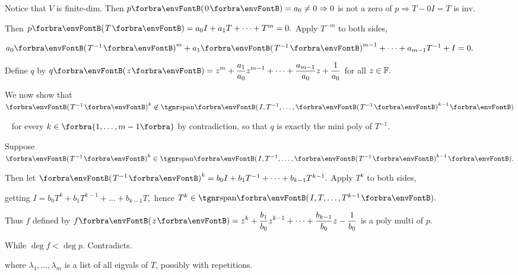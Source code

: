 \documentclass[a4paper, 11pt, UTF8]{article}
\begin{document}
\begin{large}
\par\quad
Notice that $V$ is finite-dim. Then $p\Par{0}=a_0\neq 0\Rightarrow 0$ is not a zero of $p\Rightarrow T-0I=T$ is inv.\par\quad
Then $p\Par{T}=a_0 I+a_1 T+\dots+T^m=0.$ Apply $T^{-m}$ to both sides,\par\quad
$a_0\Par{T^{-1}}^m+a_1\Par{T^{-1}}^{m-1}+\dots+a_{m-1}T^{-1}+I=0.$\par\quad
Define $q$ by $\displaystyle q\Par{z}=z^m+\frac{a_1}{a_0} z^{m-1}+\dots+\frac{a_{m-1}}{a_0}z+\frac{1}{a_0}$ for all $z\in{\mathbb{F}}.$\par\vspace{6pt}\quad
We now show that $\Par{T^{-1}}^k\not\in\Span{I,T^{-1},\dots,\Par{T^{-1}}^{k-1}}$\par\qquad\qquad\qquad\,\,\,
for every $k\in\Bra{1,\dots,m-1}$ by contradiction, so that $q$ is exactly the mini poly of $T^{-1}.$\par\quad
Suppose $\Par{T^{-1}}^k\in\Span{I,T^{-1},\dots,\Par{T^{-1}}^{k-1}}.$\par\quad
Then let $\Par{T^{-1}}^k=b_0 I+b_1 T^{-1}+\dots+b_{k-1}T^{k-1}.$ Apply $T^k$ to both sides,\par\qquad\qquad
 getting $I=b_0 T^k+b_1 T^{k-1}+\dots+b_{k-1}T,$ hence $T^k\in\Span{I,T,\dots,T^{k-1}}.$\par\vspace{6pt}\quad
Thus $f$ defined by $\displaystyle f\Par{z}=z^k+\frac{b_1}{b_0} z^{k-1}+\dots+\frac{b_{k-1}}{b_0} z-\frac{1}{b_0}$ is a poly multi of $p$.\par\quad
While $\deg f<\deg p.$ Contradicts.\PfEnd
\SepLine

\BulletPointX\NoteForSmall{[8.49]}\TextB{}
{\tgsl\large where $\lambda_1,\dots,\lambda_m$ is a list of all eigvals of $T$, {\tgsc possibly with repetitions}.}\par
\BulletPointX\Comment\TextB{}
\SepLine


\end{large}
\end{document}
